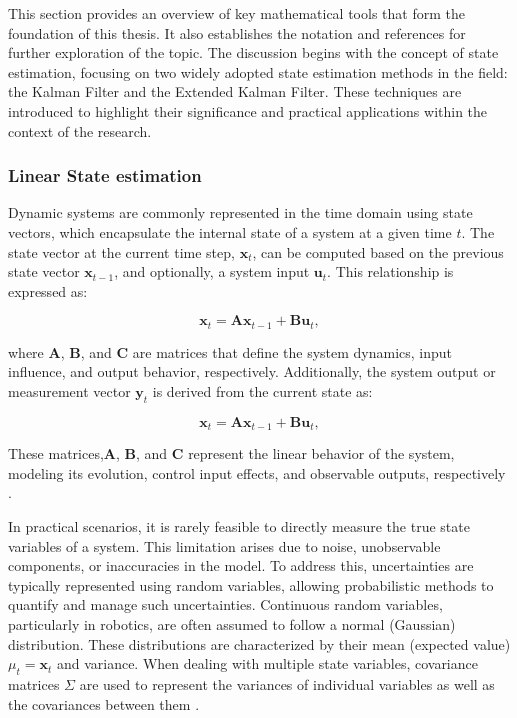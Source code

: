 This section provides an overview of key mathematical tools that form the foundation of this thesis. It also establishes the notation and references for further exploration of the topic. The discussion begins with the concept of state estimation, focusing on two widely adopted state estimation methods in the field: the Kalman Filter and the Extended Kalman Filter. These techniques are introduced to highlight their significance and practical applications within the context of the research.
\subsubsection{Linear State estimation}

Dynamic systems are commonly represented in the time domain using state vectors, which encapsulate the internal state of a system at a given time \( t \). The state vector at the current time step, \( \mathbf{x}_t \), can be computed based on the previous state vector \( \mathbf{x}_{t-1} \), and optionally, a system input \( \mathbf{u}_t \). 
This relationship is expressed as:

\[
\mathbf{x}_t = \mathbf{A} \mathbf{x}_{t-1} + \mathbf{B} \mathbf{u}_t,
\]


where \( \mathbf{A} \), \( \mathbf{B} \), and \( \mathbf{C} \) are matrices that define the system dynamics, input influence, and output behavior, respectively. Additionally, the system output or measurement vector \( \mathbf{y}_t \) is derived from the current state as:

\[
\mathbf{x}_t = \mathbf{A} \mathbf{x}_{t-1} + \mathbf{B} \mathbf{u}_t,
\]

These matrices,\( \mathbf{A} \), \( \mathbf{B} \), and \( \mathbf{C} \) represent the linear behavior of the system, modeling its evolution, control input effects, and observable outputs, respectively \citep{welch2006kalman}.

In practical scenarios, it is rarely feasible to directly measure the true state variables of a system. This limitation arises due to noise, unobservable components, or inaccuracies in the model. To address this, uncertainties are typically represented using random variables, allowing probabilistic methods to quantify and manage such uncertainties. Continuous random variables, particularly in robotics, are often assumed to follow a normal (Gaussian) distribution. These distributions are characterized by their mean (expected value) \( \mu_t = \mathbf{x}_t \) and variance. When dealing with multiple state variables, covariance matrices \( \Sigma \) are used to represent the variances of individual variables as well as the covariances between them \citep{thrun2000probabilistic}.


